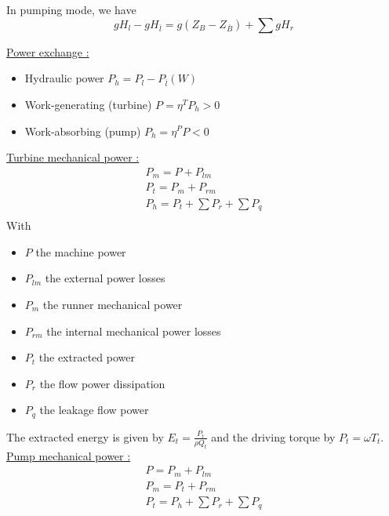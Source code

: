 \documentclass[../main.tex]{subfiles}
\begin{document}
In pumping mode, we have \begin{equation}
    gH_l - gH_{\overline{l}} = g(Z_B - Z_{\overline{B}}) + \sum gH_r
\end{equation}

\quad \underline{Power exchange :}\\
\begin{itemize}
    \item Hydraulic power $P_h = P_l - P_{\overline{l}} (W)$
    \item Work-generating (turbine) $P = \eta^T P_h >0$
    \item Work-absorbing (pump) $P_h = \eta^P P <0$
\end{itemize}

\quad \underline{Turbine mechanical power :}\\
\begin{equation}
\begin{gathered}
    P_m = P + P_{lm}\\
    P_t = P_m + P_{rm}\\
    P_h = P_t + \sum P_r + \sum P_q\\
    \end{gathered}
\end{equation}
With \begin{itemize}
    \item $P$ the machine power
    \item $P_{lm}$ the external power losses
    \item $P_m$ the runner mechanical power
    \item $P_{rm}$ the internal mechanical power losses
    \item $P_t$ the extracted power
    \item $P_r$ the flow power dissipation
    \item $P_q$ the leakage flow power
\end{itemize}
The extracted energy is given by $E_t = \frac{P_t}{\rho Q_t}$ and the driving torque by $P_t = \omega T_t$.\\

\quad \underline{Pump mechanical power :}\\
\begin{equation}
\begin{gathered}
    P = P_m + P_{lm}\\
    P_m = P_t + P_{rm}\\
    P_t = P_h + \sum P_r + \sum P_q\\
    \end{gathered}
\end{equation}
\end{document}
